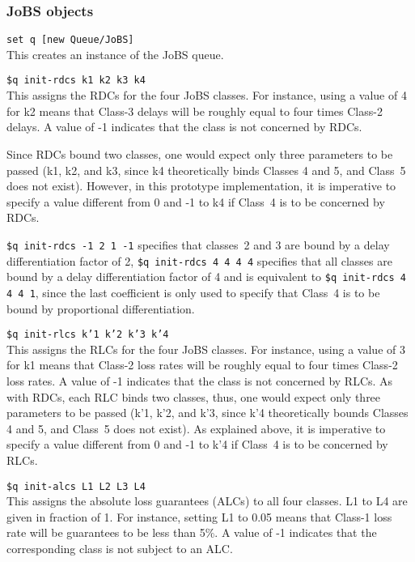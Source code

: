 \subsubsection{JoBS objects}
\begin{flushleft}
{\tt set q [new Queue/JoBS]}\\
This creates an instance of the JoBS queue. 

{\tt \$q init-rdcs \<k1\> \<k2\> \<k3\> \<k4\>}\\
This assigns the RDCs for the four JoBS classes. For instance, using a value 
of 4 for k2 means that Class-3 delays will be roughly equal to four times 
Class-2 delays. A value of -1 indicates that 
the class is not concerned by RDCs. 

 Since RDCs bound two classes, one would 
expect only three parameters to be passed (k1, k2, and k3, since k4 
theoretically binds Classes 4 and 5, and Class~5 does not exist). 
However, in this prototype implementation, it is imperative to specify a value 
different from 0 and -1 to k4 if Class~4 is to be concerned by RDCs. 

 {\tt \$q init-rdcs -1 2 1 -1} specifies that classes~2 and 3 
are bound by a delay differentiation factor of 2, {\tt \$q init-rdcs 4 4 4 4} 
specifies that all classes are bound by a delay differentiation factor of 4 and
is equivalent to {\tt \$q init-rdcs 4 4 4 1}, since the last coefficient is 
only used to specify that Class~4 is to be bound by proportional 
differentiation.

{\tt \$q init-rlcs \<k'1\> \<k'2\> \<k'3\> \<k'4\>}\\
This assigns the RLCs for the four JoBS classes. 
For instance, using a value 
of 3 for k1 means that Class-2 loss rates will be roughly equal to four times 
Class-2 loss rates.
A value of -1 indicates that 
the class is not concerned by RLCs. As with RDCs, each RLC binds two classes, 
thus, one would 
expect only three parameters to be passed (k'1, k'2, and k'3, since k'4 
theoretically bounds Classes 4 and 5, and Class~5 does not exist). 
As explained above, it is imperative to specify a value 
different from 0 and -1 to k'4 if Class~4 is to be concerned by RLCs.

{\tt \$q init-alcs \<L1\> \<L2\> \<L3\> \<L4\>}\\
This assigns the absolute loss guarantees (ALCs) to all four classes. L1 to L4 
are given in fraction of 1. For instance, setting L1 to 0.05 means that Class-1
loss rate will be guarantees to be less than 5\%. A value of -1 indicates that 
the corresponding class is not subject to an ALC.


\end{flushleft}
